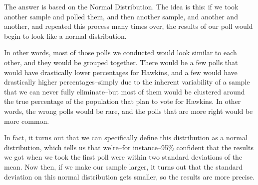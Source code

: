 The answer is based on the Normal Distribution.  The idea is this: if we took another sample and polled them, and then another sample, and another and another, and repeated this process many times over, the results of our poll would begin to look like a normal distribution.
\begin{center}
\end{center}

In other words, most of those polls we conducted would look similar to each other, and they would be grouped together.  There would be a few polls that would have drastically lower percentages for Hawkins, and a few would have drastically higher percentages--simply due to the inherent variability of a sample that we can never fully eliminate--but most of them would be clustered around the true percentage of the population that plan to vote for Hawkins.  In other words, the wrong polls would be rare, and the polls that are more right would be more common.

In fact, it turns out that we can specifically define this distribution as a normal distribution, which tells us that we're--for instance--95\% confident that the results we got when we took the first poll were within two standard deviations of the mean.  Now then, if we make our sample larger, it turns out that the standard deviation on this normal distribution gets smaller, so the results are more precise.

\begin{center}
\end{center}

